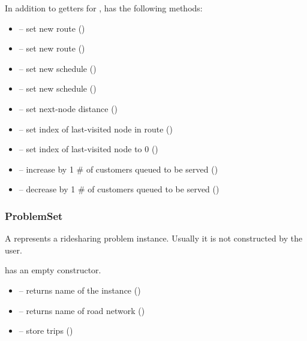  In addition to getters for ,  has the
following methods:
\begin{itemize}
    \item[]  -- set new route ()
    \item[]  -- set new route ()
    \item[]  -- set new schedule ()
    \item[]  -- set new schedule ()
    \item[]  -- set next-node distance ()
    \item[]  -- set index of last-visited node in route ()
    \item[]  -- set index of last-visited node to 0 ()
    \item[]  -- increase by 1 \# of customers queued to be served ()
    \item[]  -- decrease by 1 \# of customers queued to be served ()
\end{itemize}

\subsubsection{ProblemSet}

A  represents a ridesharing problem instance. Usually it is
not constructed by the user.

  has an empty constructor.

\begin{itemize}
\item[]  -- returns name of the instance ()
\item[]  -- returns name of road network ()
\item[]  -- store trips ()
\end{itemize}


